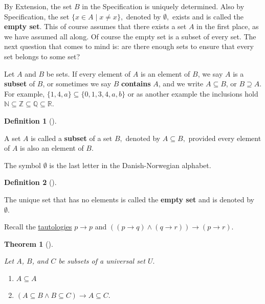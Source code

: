 \documentclass[
  letterpaper,
  10pt,
  reqno,
  twopage,
  openany]{book}
\providecommand{\tightlist}{%
  \setlength{\itemsep}{0pt}\setlength{\parskip}{0pt}}\usepackage{longtable,booktabs,array}
\theoremstyle{plain}
\theoremstyle{definition}
\theoremstyle{definition}
\newtheorem{definition}{Definition}[chapter]
\theoremstyle{definition}
\theoremstyle{plain}
\theoremstyle{plain}
\newtheorem{theorem}{Theorem}[chapter]
\theoremstyle{remark}
\begin{document}
By Extension, the set \(B\) in the Specification is uniquely determined.
Also by Specification, the set \(\{x\in A \mid x\neq x \},\) denoted by
\(\emptyset,\) exists and is called the  \textbf{empty
set}. This of course assumes that there exists a set \(A\) in the first
place, as we have assumed all along. Of course the empty set is a subset
of every set. The next question that comes to mind is: are there enough
sets to ensure that every set belongs to some set?

Let \(A\) and \(B\) be sets. If every element of \(A\) is an element of
\(B\), we say \(A\) is a  \textbf{subset} of \(B\), or
sometimes we say \(B\)  \textbf{contains} \(A\), and we
write \(A\subseteq B\), or \(B\supseteq A\). For example,
\(\{1,4,a\}\subseteq \{0,1,3,4,a,b\}\) or as another example the
inclusions hold
\(\mathbb{N} \subseteq \mathbb{Z} \subseteq \mathbb{Q}\subseteq \mathbb{R}.\)

\leavevmode{}%
\begin{definition}[]\label{def-subset}

A set \(A\) is called a  \textbf{subset} of a set \(B,\)
denoted by \(A\subseteq B,\) provided every element of \(A\) is also an
element of \(B.\)

\end{definition}

The symbol \(\emptyset\) is the last letter in the Danish-Norwegian
alphabet.

\leavevmode{}%
\begin{definition}[]\label{def-emptyset}

The unique set that has no elements is called the
\textbf{empty set} and is denoted by \(\emptyset.\)

\end{definition}

Recall the
\protect\hyperlink{thm-tautologies-used-in-proofs}{tautologies}
\(p\rightarrow p\) and
\(((p\rightarrow q)\land (q\rightarrow r))\rightarrow (p\rightarrow r).\)

\leavevmode{}%
\begin{theorem}[]\label{thm-universal}

Let \(A\), \(B\), and \(C\) be subsets of a universal set \(U.\)

\begin{enumerate}
\def\labelenumi{\arabic{enumi}.}
\tightlist
\item
  \(A\subseteq A\)
\item
  \((A\subseteq B \land B\subseteq C) \rightarrow A\subseteq C.\)\\
\end{enumerate}

\end{theorem}
\end{document}
